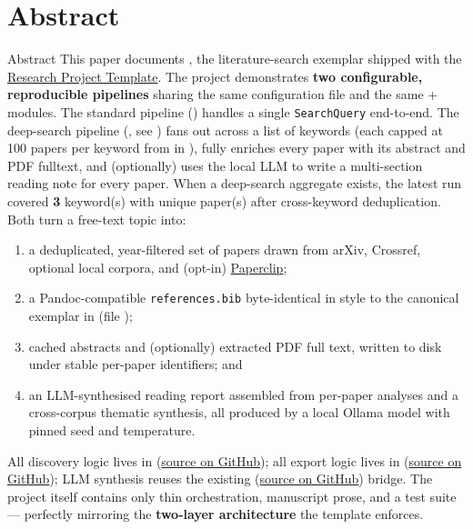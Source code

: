 \documentclass[
  ignorenonframetext,
]{beamer}
\author{\texorpdfstring{}{}}
\date{}
\providecommand{\tightlist}{%
  \setlength{\itemsep}{0pt}\setlength{\parskip}{0pt}}
\begin{document}
\section{Abstract}\label{sec:abstract}

\begin{frame}{Abstract}
This paper documents , the
literature-search exemplar shipped with the
\href{https://github.com/docxology/template}{Research Project Template}.
The project demonstrates \textbf{two configurable, reproducible
pipelines} sharing the same configuration file and the same
 + 
modules. The standard pipeline
() handles a single
\texttt{SearchQuery} end-to-end. The deep-search pipeline
(, see )
fans out across a list of keywords (each capped at 100 papers per
keyword from
 in
), fully enriches every paper with its
abstract and PDF fulltext, and (optionally) uses the local LLM to write
a multi-section reading note for every paper. When a deep-search
aggregate exists, the latest run covered \textbf{3} keyword(s) with
\textbf{} unique paper(s) after cross-keyword deduplication. Both turn a
free-text topic into:

\begin{enumerate}
\tightlist
\item
  a deduplicated, year-filtered set of papers drawn from arXiv,
  Crossref, optional local corpora, and (opt-in)
  \href{https://paperclip.gxl.ai/}{Paperclip};
\item
  a Pandoc-compatible \texttt{references.bib} byte-identical in style to
  the canonical exemplar in
  \href{../../template_code_project/manuscript/references.bib}{}
  (file );
\item
  cached abstracts and (optionally) extracted PDF full text, written to
  disk under stable per-paper identifiers; and
\item
  an LLM-synthesised reading report assembled from per-paper analyses
  and a cross-corpus thematic synthesis, all produced by a local Ollama
  model with pinned seed and temperature.
\end{enumerate}

All discovery logic lives in 
(\href{https://github.com/docxology/template/tree/main/infrastructure/search/literature}{source
on GitHub}); all export logic lives in
(\href{https://github.com/docxology/template/tree/main/infrastructure/reference/citation}{source
on GitHub}); LLM synthesis reuses the existing
(\href{https://github.com/docxology/template/tree/main/infrastructure/llm}{source
on GitHub}) bridge. The project itself contains only thin orchestration,
manuscript prose, and a test suite --- perfectly mirroring the
\textbf{two-layer architecture} the template enforces.


\end{frame}
\end{document}
